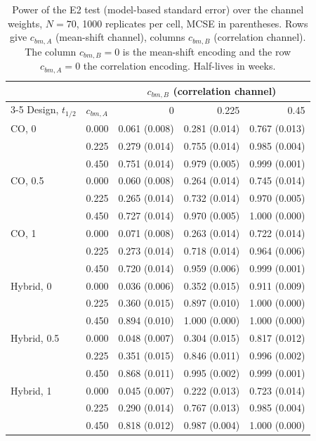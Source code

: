 \documentclass[
  11pt,
]{article}
\begin{document}
\begin{table}[H]
\small\centering
\caption{Power of the E2 test (model-based standard error) over the channel weights, $N = 70$, 1000 replicates per cell, MCSE in parentheses. Rows give $c_{bm,A}$ (mean-shift channel), columns $c_{bm,B}$ (correlation channel). The column $c_{bm,B} = 0$ is the mean-shift encoding and the row $c_{bm,A} = 0$ the correlation encoding. Half-lives in weeks.}
\label{tab:power-e2}
\begin{tabular}{llrrr}
\toprule
& & \multicolumn{3}{c}{$c_{bm,B}$ (correlation channel)} \\
\cmidrule(l){3-5}
Design, $t_{1/2}$ & $c_{bm,A}$ & 0 & 0.225 & 0.45 \\
\midrule
CO, 0 & 0.000 & 0.061 (0.008) & 0.281 (0.014) & 0.767 (0.013) \\
 & 0.225 & 0.279 (0.014) & 0.755 (0.014) & 0.985 (0.004) \\
 & 0.450 & 0.751 (0.014) & 0.979 (0.005) & 0.999 (0.001) \\
\addlinespace
CO, 0.5 & 0.000 & 0.060 (0.008) & 0.264 (0.014) & 0.745 (0.014) \\
 & 0.225 & 0.265 (0.014) & 0.732 (0.014) & 0.970 (0.005) \\
 & 0.450 & 0.727 (0.014) & 0.970 (0.005) & 1.000 (0.000) \\
\addlinespace
CO, 1 & 0.000 & 0.071 (0.008) & 0.263 (0.014) & 0.722 (0.014) \\
 & 0.225 & 0.273 (0.014) & 0.718 (0.014) & 0.964 (0.006) \\
 & 0.450 & 0.720 (0.014) & 0.959 (0.006) & 0.999 (0.001) \\
\addlinespace
Hybrid, 0 & 0.000 & 0.036 (0.006) & 0.352 (0.015) & 0.911 (0.009) \\
 & 0.225 & 0.360 (0.015) & 0.897 (0.010) & 1.000 (0.000) \\
 & 0.450 & 0.894 (0.010) & 1.000 (0.000) & 1.000 (0.000) \\
\addlinespace
Hybrid, 0.5 & 0.000 & 0.048 (0.007) & 0.304 (0.015) & 0.817 (0.012) \\
 & 0.225 & 0.351 (0.015) & 0.846 (0.011) & 0.996 (0.002) \\
 & 0.450 & 0.868 (0.011) & 0.995 (0.002) & 0.999 (0.001) \\
\addlinespace
Hybrid, 1 & 0.000 & 0.045 (0.007) & 0.222 (0.013) & 0.723 (0.014) \\
 & 0.225 & 0.290 (0.014) & 0.767 (0.013) & 0.985 (0.004) \\
 & 0.450 & 0.818 (0.012) & 0.987 (0.004) & 1.000 (0.000) \\

\end{tabular}
\end{table}
\end{document}
